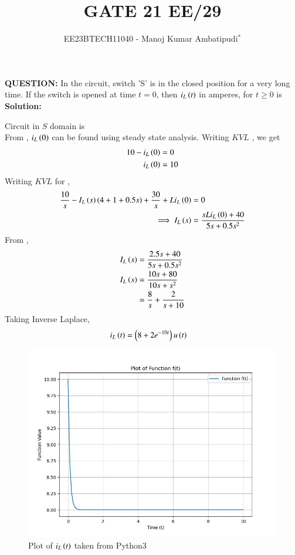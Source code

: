 \documentclass[journal,12pt,twocolumn]{IEEEtran}
\theoremstyle{remark}
\begin{document}

\vspace{3cm}
\title{GATE 21 EE/29}
\author{EE23BTECH11040 - Manoj Kumar Ambatipudi$^{*}$%
}
\maketitle
\newpage
\bigskip
\renewcommand{\thefigure}{\theenumi}
\renewcommand{\thetable}{\theenumi}
\textbf{QUESTION:}
In the circuit, switch 'S' is in the closed position for a very long time. If the switch is opened at time $t=0$, then $i_L\left(t\right)$ in amperes, for $t\geq0$ is
\\
\textbf{Solution:}

Circuit in $S$ domain is
\\
From , $i_L\left(0\right)$ can be found using steady state analysis. Writing $KVL$ , we get
\begin{align}
    10-i_L\left(0\right) &= 0\\
    i_L\left(0\right) &= 10\label{eq:EE_21_29_1}
\end{align}
Writing $KVL$ for ,
\begin{align}
    \frac{10}{s} - I_L\left(s\right)\left(4+1+0.5s\right) + \frac{30}{s} + Li_L\left(0\right) &= 0\\
    \implies I_L\left(s\right) &= \frac{sLi_L\left(0\right)+40}{5s + 0.5s^2} 
\end{align}
From , 
\begin{align}
    I_L\left(s\right) &= \frac{2.5s+40}{5s + 0.5s^2}\\
    I_L\left(s\right) &= \frac{10s+80}{10s + s^2}\\
                &= \frac{8}{s} + \frac{2}{s+10}
\end{align}
Taking Inverse Laplace, 
\begin{align}
    i_L\left(t\right) &= \left(8+2e^{-10t}\right)u\left(t\right)
\end{align}
\begin{figure}[h]
\renewcommand\thefigure{3}
    \centering
    \includegraphics[width=1.0\columnwidth]{figs/fig_3.jpg}
    \caption{Plot of $i_L\left(t\right)$ taken from Python3}
    \label{fig:EE_21_29_3}
\end{figure}
\end{document}
